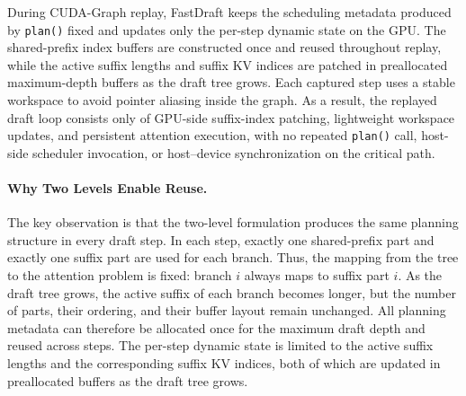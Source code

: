 \documentclass{article}
\begin{document}
During CUDA-Graph replay, FastDraft keeps the scheduling metadata produced by \texttt{plan()} fixed and updates only the per-step dynamic state on the GPU. The shared-prefix index buffers are constructed once and reused throughout replay, while the active suffix lengths and suffix KV indices are patched in preallocated maximum-depth buffers as the draft tree grows. Each captured step uses a stable workspace to avoid pointer aliasing inside the graph. As a result, the replayed draft loop consists only of GPU-side suffix-index patching, lightweight workspace updates, and persistent attention execution, with no repeated \texttt{plan()} call, host-side scheduler invocation, or host--device synchronization on the critical path.

\paragraph{Why Two Levels Enable Reuse.}
The key observation is that the two-level formulation produces the same planning structure in every draft step. In each step, exactly one shared-prefix part and exactly one suffix part are used for each branch. Thus, the mapping from the tree to the attention problem is fixed: branch $i$ always maps to suffix part $i$. As the draft tree grows, the active suffix of each branch becomes longer, but the number of parts, their ordering, and their buffer layout remain unchanged. All planning metadata can therefore be allocated once for the maximum draft depth and reused across steps. The per-step dynamic state is limited to the active suffix lengths and the corresponding suffix KV indices, both of which are updated in preallocated buffers as the draft tree grows.


\end{document}
